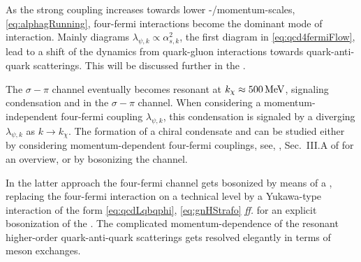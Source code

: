 As the strong coupling increases towards lower \rg{}-/momentum-scales, \cf{} \cref{eq:alphagRunning}, four-fermi interactions become the dominant mode of interaction. 
Mainly diagrams $\lambda_{\psi,k}\propto\alpha_{s,k}^2$, \cf{} the first diagram in \cref{eq:qcd4fermiFlow}, lead to a shift of the dynamics from quark-gluon interactions towards quark-anti-quark scatterings.
This will be discussed further in the .

The $\sigma-\pi$ channel eventually becomes resonant at $k_{\chi}\approx 500\,\MeV$, signaling condensation and \csb{} in the $\sigma-\pi$ channel. 
When considering a momentum-independent four-fermi coupling $\lambda_{\psi,k}$, this condensation is signaled by a diverging $\lambda_{\psi,k}$ as $k\rightarrow k_{\chi}$.
The formation of a chiral condensate and \csb{} can be studied either by considering momentum-dependent four-fermi couplings, see, \eg{}, Sec.~III.A of  for an overview, or by bosonizing the channel.\bigskip

In the latter approach the four-fermi channel gets bosonized by means of a \hsTrafoWithRefs{}, replacing the four-fermi interaction on a technical level by a Yukawa-type~\cite{Yukawa:1935xg} interaction of the form \eqref{eq:qcdLqbqphi}, \cf{} \cref{eq:gnHStrafo} \textit{ff.} for an explicit bosonization of the \gnm{}.
The complicated momentum-dependence of the resonant higher-order quark-anti-quark scatterings gets resolved elegantly in terms of meson exchanges. 

